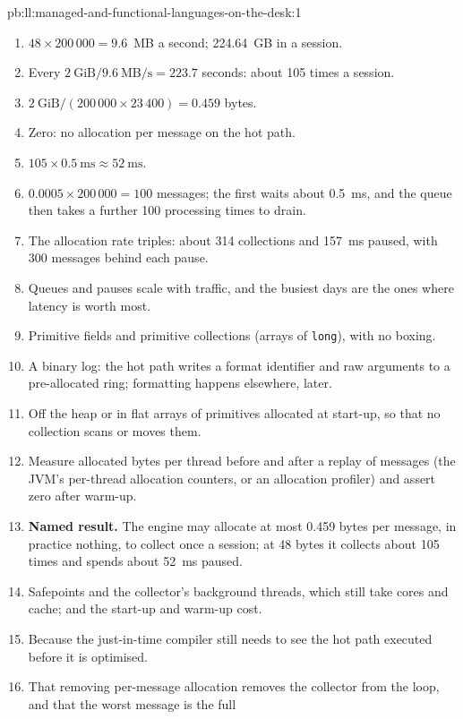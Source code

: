 \begin{solution}{pb:ll:managed-and-functional-languages-on-the-desk:1}
\begin{enumerate}
\item $48 \times 200\,000 = 9.6$~MB a second; 224.64~GB in a session.
\item Every $2~\text{GiB}/9.6~\text{MB/s} = 223.7$ seconds: about 105 times a session.
\item $2~\text{GiB}/(200\,000 \times 23\,400) = 0.459$ bytes.
\item Zero: no allocation per message on the hot path.
\item $105 \times \qty{0.5}{\milli\second} \approx \qty{52}{\milli\second}$.
\item $0.0005 \times 200\,000 = 100$ messages; the first waits about \qty{0.5}{\milli\second}, and the queue then takes a
further 100 processing times to drain.
\item The allocation rate triples: about 314 collections and \qty{157}{\milli\second} paused, with 300 messages behind each
pause.
\item Queues and pauses scale with traffic, and the busiest days are the ones where latency is worth most.
\item Primitive fields and primitive collections (arrays of \texttt{long}), with no boxing.
\item A binary log: the hot path writes a format identifier and raw arguments to a pre-allocated ring; formatting happens
elsewhere, later.
\item Off the heap or in flat arrays of primitives allocated at start-up, so that no collection scans or moves them.
\item Measure allocated bytes per thread before and after a replay of messages (the JVM's per-thread allocation counters, or
an allocation profiler) and assert zero after warm-up.
\item \textbf{Named result.} The engine may allocate at most 0.459 bytes per message, in practice nothing, to collect once a
session; at 48 bytes it collects about 105 times and spends about \qty{52}{\milli\second} paused.
\item Safepoints and the collector's background threads, which still take cores and cache; and the start-up and warm-up
cost.
\item Because the just-in-time compiler still needs to see the hot path executed before it is optimised.
\item That removing per-message allocation removes the collector from the loop, and that the worst message is the full

\end{enumerate}
\end{solution}
